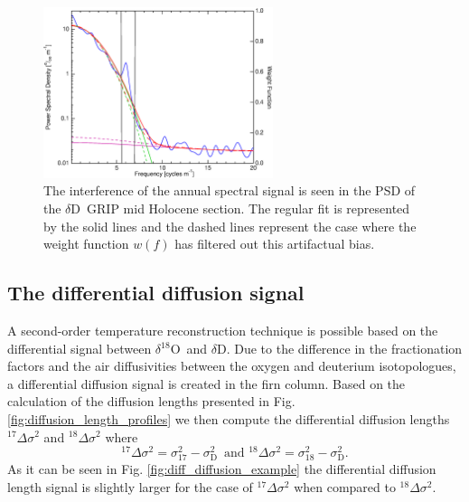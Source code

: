 \documentclass[11pt, draftcls, onecolumn]{IEEEtran} %
\numberwithin{equation}{section}
\numberwithin{table}{section}
\numberwithin{figure}{section}
\newcommand{\delOx}{$\delta{}^{18}\mathrm{O}$}
\newcommand{\delD}{$\delta\mathrm{D}$}
\begin{document}
\begin{figure}[]
	\vspace*{2mm}
	\begin{center}
		\includegraphics[width=0.6\textwidth]{Figure_5}
		\caption{The interference of the annual spectral signal is seen
			in the PSD of the \delD~GRIP mid Holocene section. The regular fit is represented by the solid lines
			and the dashed lines represent the case where the weight function $w(f)$ 
			has filtered out this artifactual bias.} \label{fig:filter_function}
	\end{center}
\end{figure}


\subsection{The differential diffusion signal}\label{sec:diff_diffusion}
A second-order temperature reconstruction technique is possible based on the differential signal between
\delOx~and \delD. Due to the difference in the fractionation factors and the air diffusivities between the oxygen and deuterium isotopologues,
a differential diffusion signal is created in the firn column. Based on the calculation of the diffusion lengths
presented in Fig. \ref{fig:diffusion_length_profiles} we then compute the differential diffusion lengths ${}^{17}\Delta\sigma^2$
and ${}^{18}\Delta\sigma^2$ where
\begin{equation}
{}^{17}\Delta\sigma^2 =  \sigma^2_{17} - \sigma^2_{\mathrm{D}} \mathrm{\,\,\,and\,\,}{}^{18}\Delta\sigma^2 =  \sigma^2_{18} - \sigma^2_{\mathrm{D}}.
\end{equation}
As it can be seen in Fig. \ref{fig:diff_diffusion_example} the differential diffusion length signal is slightly larger for the case 
of ${}^{17}\Delta\sigma^2$ when compared to  ${}^{18}\Delta\sigma^2$. 
\end{document}
